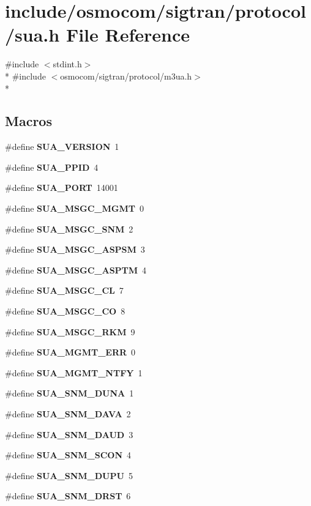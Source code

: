 \section{include/osmocom/sigtran/protocol/sua.h File Reference}
\label{sua_8h}
{\ttfamily \#include $<$stdint.\+h$>$}\\*
{\ttfamily \#include $<$osmocom/sigtran/protocol/m3ua.\+h$>$}\\*
\subsection*{Macros}
\begin{DoxyCompactItemize}
\item 
\#define {\bf S\+U\+A\+\_\+\+V\+E\+R\+S\+I\+ON}~1
\item 
\#define {\bf S\+U\+A\+\_\+\+P\+P\+ID}~4
\item 
\#define {\bf S\+U\+A\+\_\+\+P\+O\+RT}~14001
\item 
\#define {\bf S\+U\+A\+\_\+\+M\+S\+G\+C\+\_\+\+M\+G\+MT}~0
\item 
\#define {\bf S\+U\+A\+\_\+\+M\+S\+G\+C\+\_\+\+S\+NM}~2
\item 
\#define {\bf S\+U\+A\+\_\+\+M\+S\+G\+C\+\_\+\+A\+S\+P\+SM}~3
\item 
\#define {\bf S\+U\+A\+\_\+\+M\+S\+G\+C\+\_\+\+A\+S\+P\+TM}~4
\item 
\#define {\bf S\+U\+A\+\_\+\+M\+S\+G\+C\+\_\+\+CL}~7
\item 
\#define {\bf S\+U\+A\+\_\+\+M\+S\+G\+C\+\_\+\+CO}~8
\item 
\#define {\bf S\+U\+A\+\_\+\+M\+S\+G\+C\+\_\+\+R\+KM}~9
\item 
\#define {\bf S\+U\+A\+\_\+\+M\+G\+M\+T\+\_\+\+E\+RR}~0
\item 
\#define {\bf S\+U\+A\+\_\+\+M\+G\+M\+T\+\_\+\+N\+T\+FY}~1
\item 
\#define {\bf S\+U\+A\+\_\+\+S\+N\+M\+\_\+\+D\+U\+NA}~1
\item 
\#define {\bf S\+U\+A\+\_\+\+S\+N\+M\+\_\+\+D\+A\+VA}~2
\item 
\#define {\bf S\+U\+A\+\_\+\+S\+N\+M\+\_\+\+D\+A\+UD}~3
\item 
\#define {\bf S\+U\+A\+\_\+\+S\+N\+M\+\_\+\+S\+C\+ON}~4
\item 
\#define {\bf S\+U\+A\+\_\+\+S\+N\+M\+\_\+\+D\+U\+PU}~5
\item 
\#define {\bf S\+U\+A\+\_\+\+S\+N\+M\+\_\+\+D\+R\+ST}~6
\item 

\end{DoxyCompactItemize}
